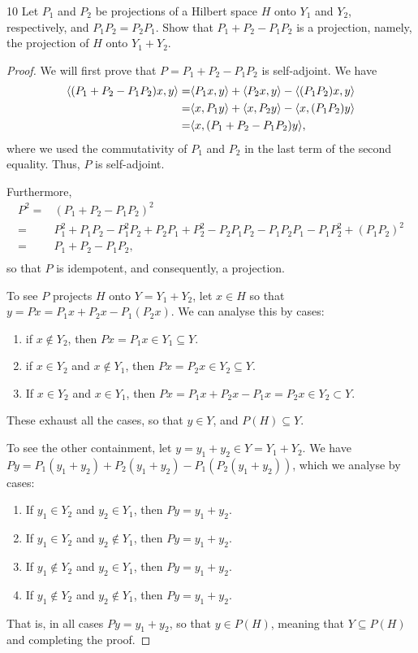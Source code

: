 \begin{exercise}{10}
Let $P_1$ and $P_2$ be projections of a Hilbert space $H$ onto $Y_1$ and $Y_2$, respectively, and $P_1 P_2 = P_2 P_1$.
Show that $P_1 + P_2 - P_1 P_2$ is a projection, namely, the projection of $H$ onto $Y_1 + Y_2$.
\end{exercise}
\begin{proof}
We will first prove that $P = P_1 + P_2 - P_1 P_2$ is self-adjoint.
We have
\begin{align*}
    \langle (P_1 + P_2 - P_1 P_2)x, y\rangle
    =& \langle P_1 x, y\rangle + \langle P_2 x, y\rangle - \langle (P_1 P_2) x, y\rangle\\
    =& \langle x, P_1 y\rangle + \langle x, P_2 y\rangle - \langle x, (P_1 P_2) y\rangle\\
    =& \langle x, (P_1 + P_2 - P_1 P_2)y\rangle,
\end{align*}
where we used the commutativity of $P_1$ and $P_2$ in the last term of the second equality.
Thus, $P$ is self-adjoint.

Furthermore, 
\begin{align*}
    P^2
    =& (P_1 + P_2 - P_1 P_2)^2\\
    =& P_1^2 + P_1 P_2 - P_1^2 P_2 + P_2 P_1 + P_2^2 - P_2 P_1 P_2 - P_1 P_2 P_1 - P_1 P_2^2 + (P_1 P_2)^2\\
    =& P_1 + P_2 - P_1 P_2,\\
\end{align*}
so that $P$ is idempotent, and consequently, a projection.

To see $P$ projects $H$ onto $Y = Y_1 + Y_2$, let $x \in H$ so that $y = Px = P_1 x + P_2 x - P_1 (P_2 x)$.
We can analyse this by cases:
\begin{enumerate}
    \item if $x \notin Y_2$, then $P x = P_1 x \in Y_1 \subseteq Y$.
    \item if $x \in Y_2$ and $x \notin Y_1$, then $P x = P_2 x \in Y_2 \subseteq Y$.
    \item If $x \in Y_2$ and $x \in Y_1$, then $P x = P_1 x + P_2 x - P_1 x = P_2 x \in Y_2 \subset Y$.
\end{enumerate}
These exhaust all the cases, so that $y \in Y$, and $P(H) \subseteq Y$.

To see the other containment, let $y = y_1 + y_2 \in Y = Y_1 + Y_2$.
We have $P y = P_1 (y_1 + y_2) + P_2 (y_1 + y_2) - P_1 (P_2 (y_1 + y_2))$, which we analyse by cases:
\begin{enumerate}
    \item If $y_1 \in Y_2$ and $y_2 \in Y_1$, then $Py = y_1 + y_2$.
    \item If $y_1 \in Y_2$ and $y_2 \notin Y_1$, then $Py = y_1 + y_2$.
    \item If $y_1 \notin Y_2$ and $y_2 \in Y_1$, then $Py = y_1 + y_2$.
    \item If $y_1 \notin Y_2$ and $y_2 \notin Y_1$, then $Py = y_1 + y_2$.
\end{enumerate}
That is, in all cases $Py = y_1 + y_2$, so that $y \in P(H)$, meaning that $Y \subseteq P(H)$ and completing the proof.
\end{proof} 

